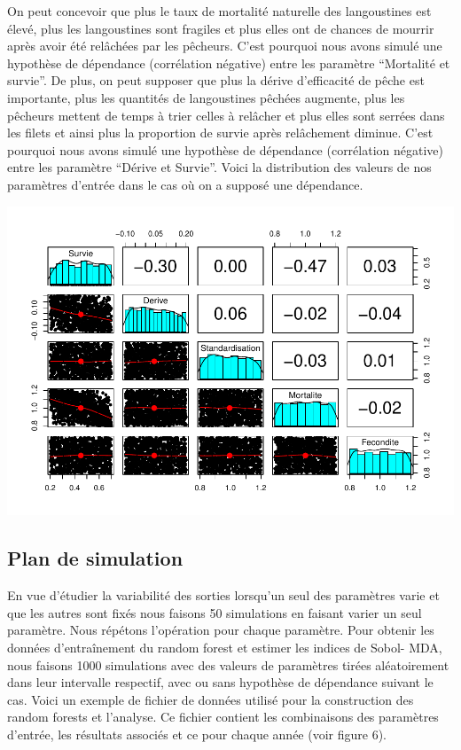 \documentclass[
]{article}
\begin{document}
On peut concevoir que plus le taux de mortalité naturelle des
langoustines est élevé, plus les langoustines sont fragiles et plus
elles ont de chances de mourrir après avoir été relâchées par les
pêcheurs. C'est pourquoi nous avons simulé une hypothèse de dépendance
(corrélation négative) entre les paramètre ``Mortalité et survie''. De
plus, on peut supposer que plus la dérive d'efficacité de pêche est
importante, plus les quantités de langoustines pêchées augmente, plus
les pêcheurs mettent de temps à trier celles à relâcher et plus elles
sont serrées dans les filets et ainsi plus la proportion de survie après
relâchement diminue. C'est pourquoi nous avons simulé une hypothèse de
dépendance (corrélation négative) entre les paramètre ``Dérive et
Survie''. Voici la distribution des valeurs de nos paramètres d'entrée
dans le cas où on a supposé une dépendance.

\includegraphics{rapport_files/figure-latex/acx-1.pdf}

\hypertarget{plan-de-simulation}{%
\subsection{Plan de simulation}\label{plan-de-simulation}}

En vue d'étudier la variabilité des sorties lorsqu'un seul des
paramètres varie et que les autres sont fixés nous faisons 50
simulations en faisant varier un seul paramètre. Nous répétons
l'opération pour chaque paramètre. Pour obtenir les données
d'entraînement du random forest et estimer les indices de Sobol- MDA,
nous faisons 1000 simulations avec des valeurs de paramètres tirées
aléatoirement dans leur intervalle respectif, avec ou sans hypothèse de
dépendance suivant le cas. Voici un exemple de fichier de données
utilisé pour la construction des random forests et l'analyse. Ce fichier
contient les combinaisons des paramètres d'entrée, les résultats
associés et ce pour chaque année (voir figure 6).
\end{document}

